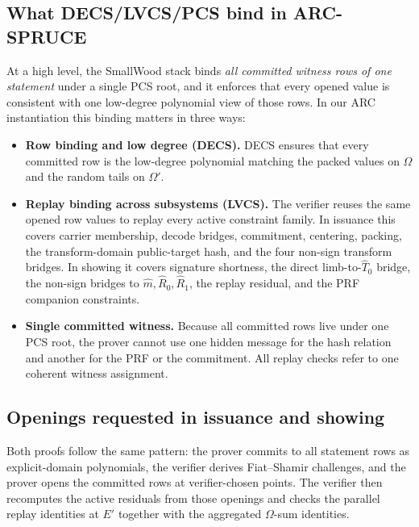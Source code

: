 \subsection{What DECS/LVCS/PCS bind in ARC-SPRUCE}
\label{app:smallwood-binds}
At a high level, the SmallWood stack binds \emph{all committed witness rows of
one statement} under a single PCS root, and it enforces that every opened value
is consistent with one low-degree polynomial view of those rows. In our ARC
instantiation this binding matters in three ways:
\begin{itemize}[leftmargin=1.25em]
  \item \textbf{Row binding and low degree (DECS).}
  DECS ensures that every committed row is the low-degree polynomial matching
  the packed values on \(\Omega\) and the random tails on \(\Omega'\).
  \item \textbf{Replay binding across subsystems (LVCS).}
  The verifier reuses the same opened row values to replay every active
  constraint family. In issuance this covers carrier membership, decode
  bridges, commitment, centering, packing, the transform-domain public-target
  hash, and the four non-sign transform bridges. In showing it covers
  signature shortness, the direct limb-to-\(\widehat T_0\) bridge, the
  non-sign bridges to \(\widehat m,\widehat R_0,\widehat R_1\), the replay
  residual, and the PRF companion constraints.
  \item \textbf{Single committed witness.}
  Because all committed rows live under one PCS root, the prover cannot use one
  hidden message for the hash relation and another for the PRF or the
  commitment. All replay checks refer to one coherent witness assignment.
\end{itemize}

\subsection{Openings requested in issuance and showing}
\label{app:smallwood-openings}
Both proofs follow the same pattern: the prover commits to all statement rows
as explicit-domain polynomials, the verifier derives Fiat--Shamir challenges,
and the prover opens the committed rows at verifier-chosen points. The verifier
then recomputes the active residuals from those openings and checks the
parallel replay identities at \(E'\) together with the aggregated
\(\Omega\)-sum identities.

